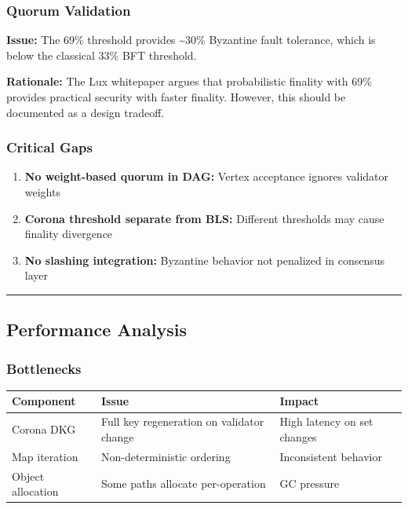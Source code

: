 \documentclass[
]{article}
\newcounter{none} %
\providecommand{\tightlist}{%
  \setlength{\itemsep}{0pt}\setlength{\parskip}{0pt}}
\begin{document}
\subsubsection{Quorum Validation}\label{quorum-validation}

\textbf{Issue:} The 69\% threshold provides \textasciitilde30\%
Byzantine fault tolerance, which is below the classical 33\% BFT
threshold.

\textbf{Rationale:} The Lux whitepaper argues that probabilistic
finality with 69\% provides practical security with faster finality.
However, this should be documented as a design tradeoff.

\subsubsection{Critical Gaps}\label{critical-gaps}

\begin{enumerate}
\def\labelenumi{\arabic{enumi}.}
\tightlist
\item
  \textbf{No weight-based quorum in DAG:} Vertex acceptance ignores
  validator weights
\item
  \textbf{Corona threshold separate from BLS:} Different thresholds
  may cause finality divergence
\item
  \textbf{No slashing integration:} Byzantine behavior not penalized in
  consensus layer
\end{enumerate}

\begin{center}\rule{0.5\linewidth}{0.5pt}\end{center}

\subsection{Performance Analysis}\label{performance-analysis}

\subsubsection{Bottlenecks}\label{bottlenecks}

{\def\LTcaptype{none} %
\begin{longtable}[]{@{}lll@{}}
\toprule\noalign{}
Component & Issue & Impact \\
\midrule\noalign{}
\endhead
\bottomrule\noalign{}
\endlastfoot
Corona DKG & Full key regeneration on validator change & High latency
on set changes \\
Map iteration & Non-deterministic ordering & Inconsistent behavior \\
Object allocation & Some paths allocate per-operation & GC pressure \\
\end{longtable}
}
\end{document}
